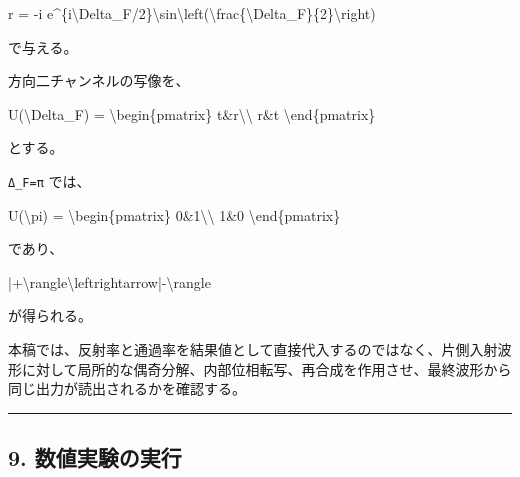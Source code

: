 \documentclass[
  a4paper,
]{article}
\newenvironment{Shaded}{}{}
\newcommand{\NormalTok}[1]{#1}
\begin{document}
\begin{Shaded}
\begin{Highlighting}[]
\NormalTok{r}
\NormalTok{=}
\NormalTok{{-}i e\^{}\{i\textbackslash{}Delta\_F/2\}\textbackslash{}sin\textbackslash{}left(\textbackslash{}frac\{\textbackslash{}Delta\_F\}\{2\}\textbackslash{}right)}
\end{Highlighting}
\end{Shaded}

で与える。

方向二チャンネルの写像を、

\begin{Shaded}
\begin{Highlighting}[]
\NormalTok{U(\textbackslash{}Delta\_F)}
\NormalTok{=}
\NormalTok{\textbackslash{}begin\{pmatrix\}}
\NormalTok{t\&r\textbackslash{}\textbackslash{}}
\NormalTok{r\&t}
\NormalTok{\textbackslash{}end\{pmatrix\}}
\end{Highlighting}
\end{Shaded}

とする。

\texttt{Δ\_F=π} では、

\begin{Shaded}
\begin{Highlighting}[]
\NormalTok{U(\textbackslash{}pi)}
\NormalTok{=}
\NormalTok{\textbackslash{}begin\{pmatrix\}}
\NormalTok{0\&1\textbackslash{}\textbackslash{}}
\NormalTok{1\&0}
\NormalTok{\textbackslash{}end\{pmatrix\}}
\end{Highlighting}
\end{Shaded}

であり、

\begin{Shaded}
\begin{Highlighting}[]
\NormalTok{|+\textbackslash{}rangle\textbackslash{}leftrightarrow|{-}\textbackslash{}rangle}
\end{Highlighting}
\end{Shaded}

が得られる。

本稿では、反射率と通過率を結果値として直接代入するのではなく、片側入射波形に対して局所的な偶奇分解、内部位相転写、再合成を作用させ、最終波形から同じ出力が読出されるかを確認する。

\begin{center}\rule{0.5\linewidth}{0.5pt}\end{center}

\subsection{9.
数値実験の実行}\label{ux6570ux5024ux5b9fux9a13ux306eux5b9fux884c}
\end{document}

